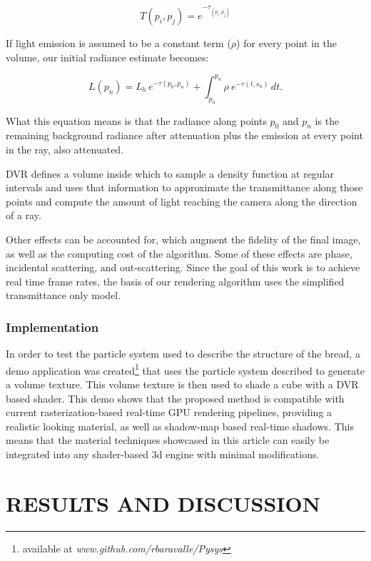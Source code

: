 \documentclass[oneside,a4paper,english,links]{amca}
\begin{document}
\begin{equation} \label{eq:general_radiance}  
T(p_i,p_j) = e^{-\tau_{(p_i, p_j)}}
\end{equation}

If light emission is assumed to be a constant term ($\rho$) for
every point in the volume, our initial radiance estimate becomes:

\begin{equation} \label{eq:ray_radiance}  
L(p_n) = L_b \ e^{-\tau(p_0, p_n)} + \int_{p_0}^{p_n} \rho \ e^{-\tau(t,s_n)} \, dt.
\end{equation}

What this equation means is that the radiance along points $p_0$ and
$p_n$ is the remaining background radiance after attenuation plus the
emission at every point in the ray, also attenuated.

DVR defines a volume inside which to sample a density function at
regular intervals and uses that information to approximate the
transmittance along those points and compute the amount of light
reaching the camera along the direction of a ray. 

Other effects can be accounted for, which augment the fidelity of the
final image, as well as the computing cost of the algorithm. Some of
these effects are phase, incidental scattering, and
out-scattering. Since the goal of this work is to achieve real time
frame rates, the basis of our rendering algorithm uses the simplified
transmittance only model.

\subsubsection{Implementation}

In order to test the particle system used to describe the structure of
the bread, a demo application was created\footnote{available at
  \emph{www.github.com/rbaravalle/Pysys}} that uses the particle
system described to generate a volume texture. This volume texture is
then used to shade a cube with a DVR based shader. This demo shows
that the proposed method is compatible with current
rasterization-based real-time GPU rendering pipelines, providing a
realistic looking material, as well as shadow-map based real-time
shadows. This means that the material techniques showcased in this
article  can easily be integrated into any shader-based 3d engine with
minimal modifications.


\section{RESULTS AND DISCUSSION}
\end{document}
